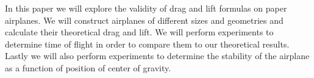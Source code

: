 % 
% 
%
In this paper we will explore the validity of drag and lift formulas on 
paper airplanes. We will construct airplanes of different sizes and geometries 
and calculate their theoretical drag and lift. We will perform experiments to
determine time of flight in order to compare them to our theoretical results.
Lastly we will also perform experiments to determine the stability of the airplane
as a function of position of center of gravity.
